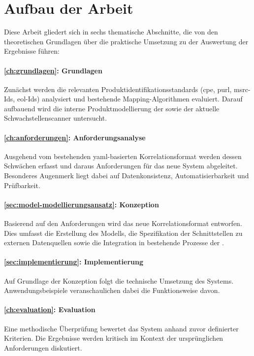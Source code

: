 \section{Aufbau der Arbeit}\label{sec:arbeit-aufbau}

Diese Arbeit gliedert sich in sechs thematische Abschnitte, die von den theoretischen Grundlagen über die praktische Umsetzung zu der Auswertung der Ergebnisse führen:

\paragraph{\autoref{ch:grundlagen}: Grundlagen}
Zunächst werden die relevanten Produktidentifikationsstandards (\acrshort{cpe}, \acrshort{purl}, \acrshort{msrc}-Ids, \acrshort{eol}-Ids) analysiert und bestehende Mapping-Algorithmen evaluiert.
Darauf aufbauend wird die interne Produktmodellierung der \metaeffektsp sowie der aktuelle Schwachstellenscanner untersucht.

\paragraph{\autoref{ch:anforderungen}: Anforderungsanalyse}
Ausgehend vom bestehenden \acrshort{yaml}-basierten Korrelationsformat werden dessen Schwächen erfasst und daraus Anforderungen für das neue System abgeleitet.
Besonderes Augenmerk liegt dabei auf Datenkonsistenz, Automatisierbarkeit und Prüfbarkeit.

\paragraph{\autoref{sec:model-modellierungsansatz}: Konzeption}
Basierend auf den Anforderungen wird das neue Korrelationsformat entworfen.
Dies umfasst die Erstellung des Modells, die Spezifikation der Schnittstellen zu externen Datenquellen sowie die Integration in bestehende Prozesse der \metaeffekt.

\paragraph{\autoref{sec:implementierung}: Implementierung}
Auf Grundlage der Konzeption folgt die technische Umsetzung des Systems.
Anwendungsbeispiele veranschaulichen dabei die Funktionsweise davon.

\paragraph{\autoref{ch:evaluation}: Evaluation}
Eine methodische Überprüfung bewertet das System anhand zuvor definierter Kriterien.
Die Ergebnisse werden kritisch im Kontext der ursprünglichen Anforderungen diskutiert.

